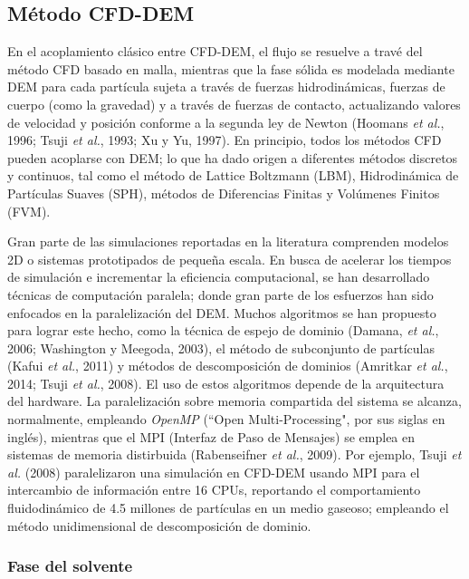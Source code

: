 \subsection{M\'etodo CFD-DEM} \label{MCFDEM}

\noindent
\justify

En el acoplamiento cl\'asico entre CFD-DEM, el flujo se resuelve a trav\'e del m\'etodo CFD basado en malla, mientras que la fase s\'olida es modelada mediante DEM para cada part\'icula sujeta a trav\'es de fuerzas hidrodin\'amicas, fuerzas de cuerpo (como la gravedad) y a trav\'es de fuerzas de contacto, actualizando valores de velocidad y posici\'on conforme a la segunda ley de Newton (Hoomans \textit{et al.}, 1996; Tsuji \textit{et al.}, 1993; Xu y Yu, 1997). En principio, todos los m\'etodos CFD pueden acoplarse con DEM; lo que ha dado origen a diferentes m\'etodos discretos y continuos, tal como el m\'etodo de Lattice Boltzmann (LBM), Hidrodin\'amica de Part\'iculas Suaves (SPH), m\'etodos de Diferencias Finitas y Vol\'umenes Finitos (FVM).

\noindent
\justify

Gran parte de las simulaciones reportadas en la literatura comprenden modelos 2D o sistemas prototipados de peque\~na escala. En busca de acelerar los tiempos de simulaci\'on e incrementar la eficiencia computacional, se han desarrollado t\'ecnicas de computaci\'on paralela; donde gran parte de los esfuerzos han sido enfocados en la paralelizaci\'on del DEM. Muchos algoritmos se han propuesto para lograr este hecho, como la t\'ecnica de espejo de dominio (Damana, \textit{et al.}, 2006; Washington y Meegoda, 2003), el m\'etodo de subconjunto de part\'iculas (Kafui \textit{et al.}, 2011) y m\'etodos de descomposici\'on de dominios (Amritkar \textit{et al.}, 2014; Tsuji \textit{et al.}, 2008). El uso de estos algoritmos depende de la arquitectura del hardware. La paralelizaci\'on sobre memoria compartida del sistema se alcanza, normalmente, empleando \textit{OpenMP} (``Open Multi-Processing", por sus siglas en ingl\'es), mientras que el MPI (Interfaz de Paso de Mensajes) se emplea en sistemas de memoria distirbuida (Rabenseifner \textit{et al.}, 2009). Por ejemplo, Tsuji \textit{et al.} (2008) paralelizaron una simulaci\'on en CFD-DEM usando MPI para el intercambio de informaci\'on entre 16 CPUs, reportando el comportamiento fluidodin\'amico de 4.5 millones de part\'iculas en un medio gaseoso; empleando el m\'etodo unidimensional de descomposici\'on de dominio.

\subsubsection{Fase del solvente}

